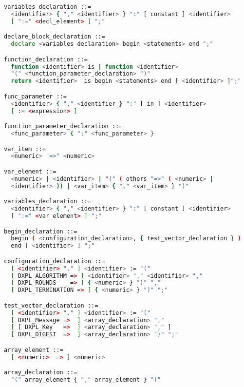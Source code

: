 \documentclass{acmtrans2m}
\begin{document}
\begin{lstlisting}[language=bash,numbers=none]
variables_declaration ::=
  <identifier> { "," <identifier> } ":" [ constant ] <identifier>
  [ ":=" <decl_element> ] ";"

declare_block_declaration ::=
  declare <variables_declaration> begin <statements> end ";" 

function_declaration ::=
  function <identifier> is | function <identifier> 
  "(" <function_parameter_declaration> ")"
  return <identifier>  is begin <statements> end [ <identifier> ]";"

func_parameter ::=
  <identifier> { "," <identifier } ":" [ in ] <identifier>
  [ := <expression> ]

function_parameter_declaration ::= 
  <func_parameter> { ";" <func_parameter> }

var_item ::=
  <numeric> "=>" <numeric>

var_element ::=
  <numeric> | <identifier> | "(" ( others "=>" ( <numeric> | 
  <identifier> )) | <var_item> { "," <var_item> } ")" 

variables_declaration ::=
  <identifier> { "," <identifier> } ":" [ constant ] <identifier> 
  [ ":=" <var_element> ] ";"

begin_declaration ::=
  begin ( <configuration_declaration>, { test_vector_declaration } )
  end [ <identifier> ] ";"

configuration_declaration ::= 
  [ <identifier> "." ] <identifier> := "(" 
  [ DXPL_ALGORITHM => ] <identifier> "." <identifier> "," 
  [ DXPL_ROUNDS    => ] { <numeric> } ")" ","
  [ DXPL_TERMINATION => ] { <numeric> } ")" ";"

test_vector_declaration ::=
  [ <identifier> "." ] <identifier> := "("
  [ DXPL_Message =>  ] <array_declaration> ","
  [ [ DXPL_Key   =>  ] <array_declaration> "," ]
  [ DXPL_DIGEST  =>  ] <array_declaration> ")" ";"

array_element ::=
  [ <numeric>  => ] <numeric>

array_declaration ::= 
  "(" array_element { "," array_element } ")"
\end{lstlisting}
\end{document}
